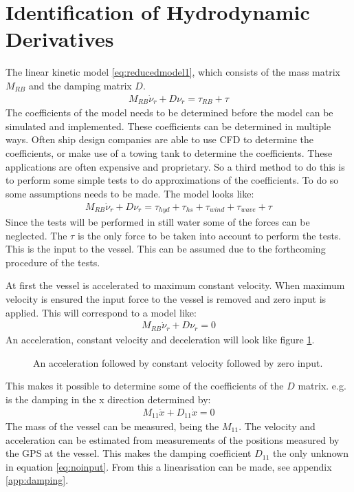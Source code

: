 \section{Identification of Hydrodynamic Derivatives}
\label{sec:hydrocoeff}
The linear kinetic model \eqref{eq:reducedmodel1}, which consists of the mass matrix $M_{RB}$ and the damping matrix $D$.
\begin{align}
M_{RB} \dot \nu_r + D\nu_r = \tau_{RB} + \tau
\label{eq:reducedmodel1}
\end{align}
The coefficients of the model needs to be determined before the model can be simulated and implemented. These coefficients can be determined in multiple ways. Often ship design companies are able to use \ac{CFD} to determine the coefficients, or make use of a towing tank to determine the coefficients. These applications are often expensive and proprietary. So a third method to do this is to perform some simple tests to do approximations of the coefficients. To do so some assumptions needs to be made. The model looks like:
\begin{align}
M_{RB} \dot \nu_r + D\nu_r = \tau_{hyd} + \tau_{hs} + \tau_{wind} + \tau_{wave} + \tau
\end{align}
Since the tests will be performed in still water some of the forces can be neglected. The $\tau$ is the only force to be taken into account to perform the tests. This is the input to the vessel. This can be assumed due to the forthcoming procedure of the tests.

At first the vessel is accelerated to maximum constant velocity. When maximum velocity is ensured the input force to the vessel is removed and zero input is applied. This will correspond to a model like:
\begin{align}
M_{RB} \dot \nu_r + D\nu_r = 0
\label{eq:decelmodel}
\end{align}
An acceleration, constant velocity and deceleration will look like figure \ref{fig:acceldecel}.
\begin{figure}[htbp]
	\centering
	
	\caption{An acceleration followed by constant velocity followed by zero input.}
	\label{fig:acceldecel}
\end{figure}
This makes it possible to determine some of the coefficients of the $D$ matrix. e.g. is the damping in the x direction determined by:
\begin{align} 
M_{11} \ddot x + D_{11} \dot x = 0
\label{eq:noinput}
\end{align}
The mass of the vessel can be measured, being the $M_{11}$. The velocity and acceleration can be estimated from measurements of the positions measured by the \ac{GPS} at the vessel. This makes the damping coefficient $D_{11}$ the only unknown in equation \ref{eq:noinput}. From this a linearisation can be made, see appendix \ref{app:damping}.

